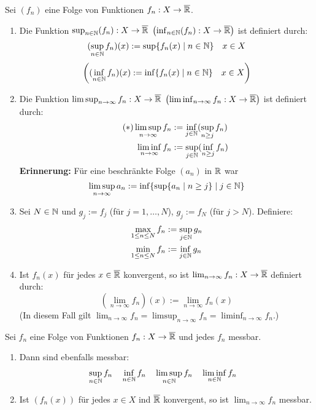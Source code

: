 \documentclass[a4paper,twoside,DIV15,BCOR12mm,chapterprefix=true,headings=onelinechapter]{scrbook}
\begin{document}
\begin{definition}
Sei $(f_n)$ eine Folge von Funktionen $f_n:X\to\overline{\mathbb{R}}$.
\begin{enumerate}
\item Die Funktion $\sup_{n\in\mathbb{N}}(f_n):X\to\overline{\mathbb{R}}$  $\left(\inf_{n\in\mathbb{N}}(f_n):X\to\overline{\mathbb{R}}\right)$ ist definiert durch:
\[(\sup_{n\in\mathbb{N}} f_n)(x):=\sup\{f_n(x)\mid n\in\mathbb{N}\}\quad x\in X\]
\[\left((\inf_{n\in\mathbb{N}} f_n)(x):=\inf\{f_n(x)\mid n\in\mathbb{N}\}\quad x\in X\right)\]
\item Die Funktion $\limsup_{n\to\infty} f_n:X\to\overline{\mathbb{R}}$ $\left(\liminf_{n\to\infty} f_n:X\to\overline{\mathbb{R}}\right)$ ist definiert durch:
\begin{align*}
\tag{$*$} \limsup_{n\to\infty} f_n &:= \inf_{j\in\mathbb{N}}(\sup_{n\ge j} f_n)\\
\liminf_{n\to\infty} f_n &:= \sup_{j\in\mathbb{N}}(\inf_{n\ge j} f_n)
\end{align*}
\textbf{Erinnerung:} Für eine beschränkte Folge $(a_n)$ in $\mathbb{R}$ war
\[\limsup_{n\to\infty} a_n:=\inf\{\sup\{a_n\mid n\ge j\}\mid j\in\mathbb{N}\}\]
\item Sei $N\in\mathbb{N}$ und $g_j:=f_j$ (für $j=1,\ldots,N$), $g_j:=f_N$ (für $j>N$). Definiere:
\begin{align*}
\max_{1\le n\le N} f_n &:=\sup_{j\in\mathbb{N}} g_n\\
\min_{1\le n\le N} f_n &:=\inf_{j\in\mathbb{N}} g_n
\end{align*}
\item Ist $f_n(x)$ für jedes $x\in\overline{\mathbb{R}}$ konvergent, so ist $\lim_{n\to\infty} f_n:X\to\overline{\mathbb{R}}$ definiert durch:
\[(\lim_{n\to\infty} f_n)(x):=\lim_{n\to\infty} f_n(x)\]
(In diesem Fall gilt $\lim_{n\to\infty} f_n = \limsup_{n\to\infty} f_n = \liminf_{n\to\infty} f_n$.)
\end{enumerate}
\end{definition}

\begin{satz}
\label{Satz 3.5}
Sei $f_n$ eine Folge von Funktionen $f_n:X\to\overline{\mathbb{R}}$ und jedes $f_n$ messbar.
\begin{enumerate}
\item Dann sind ebenfalls messbar:
\begin{align*}
&\sup_{n\in\mathbb{N}} f_n  &&\inf_{n\in\mathbb{N}} f_n &&\limsup_{n\in\mathbb{N}} f_n &&\liminf_{n\in\mathbb{N}} f_n
\end{align*}
\item Ist $(f_n(x))$ für jedes $x\in X$ ind $\overline{\mathbb{R}}$ konvergent, so ist $\lim_{n\to\infty} f_n$ messbar.
\end{enumerate}
\end{satz}
\end{document}

